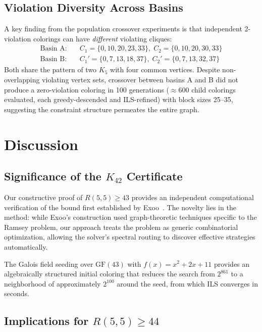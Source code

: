 \documentclass[11pt,a4paper]{article}
\theoremstyle{plain}
\theoremstyle{remark}
\newcommand{\GF}{\mathrm{GF}}
\begin{document}
\subsection{Violation Diversity Across Basins}

A key finding from the population crossover experiments is that
independent 2-violation colorings can have \emph{different} violating
cliques:
\begin{align*}
  \text{Basin A:}\quad & C_1 = \{0, 10, 20, 23, 33\},\;
    C_2 = \{0, 10, 20, 30, 33\} \\
  \text{Basin B:}\quad & C_1' = \{0, 7, 13, 18, 37\},\;
    C_2' = \{0, 7, 13, 32, 37\}
\end{align*}
Both share the pattern of two $K_5$ with four common vertices.
Despite non-overlapping violating vertex sets, crossover between
basins A and B did not produce a zero-violation coloring in 100
generations ($\approx$600 child colorings evaluated, each greedy-descended
and ILS-refined) with block sizes 25--35, suggesting the constraint
structure permeates the entire graph.

\section{Discussion}

\subsection{Significance of the $K_{42}$ Certificate}

Our constructive proof of $R(5,5) \geq 43$ provides an independent
computational verification of the bound first established by
Exoo~\cite{exoo1989}. The novelty lies in the method: while Exoo's
construction used graph-theoretic techniques specific to the Ramsey
problem, our approach treats the problem as generic combinatorial
optimization, allowing the solver's spectral routing to discover
effective strategies automatically.

The Galois field seeding over $\GF(43)$ with $f(x) = x^2 + 2x + 11$
provides an algebraically structured initial coloring that reduces
the search from $2^{861}$ to a neighborhood of approximately
$2^{100}$ around the seed, from which ILS converges in seconds.

\subsection{Implications for $R(5,5) \geq 44$}
\end{document}
